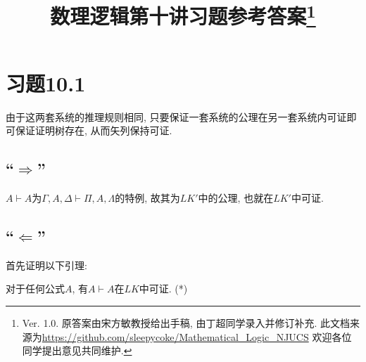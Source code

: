 \documentclass{article}
\begin{document}
\title{数理逻辑第十讲习题参考答案\footnote{Ver. 1.0. 原答案由宋方敏教授给出手稿, 由丁超同学录入并修订补充. 此文档来源为\url{https://github.com/sleepycoke/Mathematical_Logic_NJUCS}
 欢迎各位同学提出意见共同维护. 
}}
\maketitle

\section*{习题10.1}
由于这两套系统的推理规则相同, 只要保证一套系统的公理在另一套系统内可证即可保证证明树存在, 从而矢列保持可证. 
\subsection*{``$\Rightarrow$''}
$A\vdash A$为$\Gamma, A, \Delta \vdash \Pi, A, \Lambda$的特例, 故其为$LK'$中的公理, 也就在$LK'$中可证.  
\subsection*{``$\Leftarrow$''}
首先证明以下引理: 

对于任何公式$A$, 有$A\vdash A$在$LK$中可证. (*)
\end{document}
